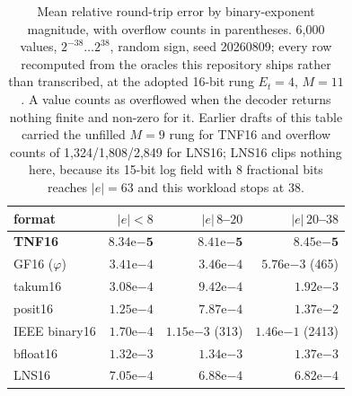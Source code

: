 \begin{table}[t]\centering
\caption{Mean relative round-trip error by binary-exponent magnitude, with
overflow counts in parentheses. 6{,}000 values, $2^{-38}\ldots2^{38}$, random
sign, seed 20260809; every row recomputed from the oracles this repository ships
rather than transcribed, at the adopted 16-bit rung $E_t{=}4$, $M{=}11$. A value
counts as overflowed when the decoder returns nothing finite and non-zero for it.
Earlier drafts of this table carried the unfilled $M{=}9$ rung for TNF16 and
overflow counts of 1{,}324/1{,}808/2{,}849 for LNS16; LNS16 clips nothing here,
because its 15-bit log field with 8 fractional bits reaches $|e|=63$ and this
workload stops at 38.}
\label{tab:field}
\begin{tabular}{lrrr}
\toprule
format & $|e|<8$ & $|e|\,8$--$20$ & $|e|\,20$--$38$ \\
\midrule
\textbf{TNF16}    & $\mathbf{8.34\mathrm{e}{-5}}$ & $\mathbf{8.41\mathrm{e}{-5}}$ & $\mathbf{8.45\mathrm{e}{-5}}$ \\
GF16 ($\varphi$)   & $3.41\mathrm{e}{-4}$ & $3.46\mathrm{e}{-4}$ & $5.76\mathrm{e}{-3}$ (465) \\
takum16            & $3.08\mathrm{e}{-4}$ & $9.42\mathrm{e}{-4}$ & $1.92\mathrm{e}{-3}$ \\
posit16            & $1.25\mathrm{e}{-4}$ & $7.87\mathrm{e}{-4}$ & $1.37\mathrm{e}{-2}$ \\
IEEE binary16      & $1.70\mathrm{e}{-4}$ & $1.15\mathrm{e}{-3}$ (313) & $1.46\mathrm{e}{-1}$ (2413) \\
bfloat16           & $1.32\mathrm{e}{-3}$ & $1.34\mathrm{e}{-3}$ & $1.37\mathrm{e}{-3}$ \\
LNS16              & $7.05\mathrm{e}{-4}$ & $6.88\mathrm{e}{-4}$ & $6.82\mathrm{e}{-4}$ \\
\bottomrule
\end{tabular}
\end{table}

